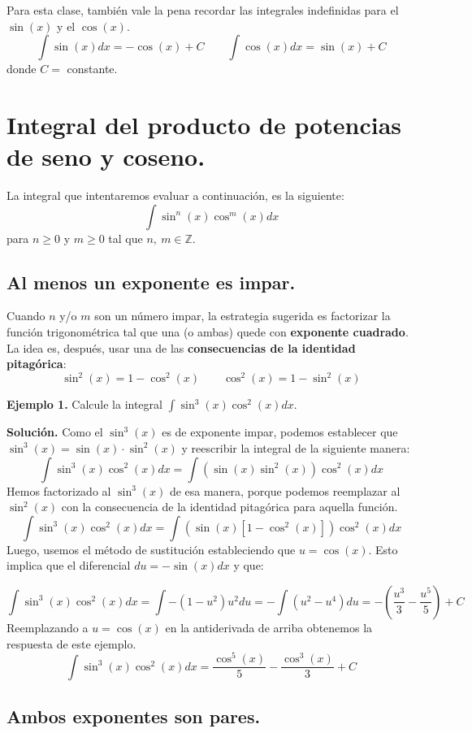 \documentclass[12pt]{article}
\begin{document}
Para esta clase, también vale la pena recordar las integrales indefinidas para el $\sin(x)$ y el $\cos(x)$.
\[
  \int \sin(x)dx = -\cos(x) + C \qquad \int \cos(x)dx = \sin(x) + C
\]
donde $C =$ constante.


\section{Integral del producto de potencias de seno y coseno.}

La integral que intentaremos evaluar a continuación, es la siguiente:
\[
  \int \sin^{n}(x)\cos^{m}(x)dx
\]
para $n \geq 0$ y $m \geq 0$ tal que $n, \ m \in \mathbb{Z}$.

\subsection{Al menos un exponente es impar.}

Cuando $n$ y/o $m$ son un número impar, la estrategia sugerida es factorizar la función trigonométrica tal que una (o ambas) quede con \textbf{exponente cuadrado}. La idea es, después, usar una de las \textbf{consecuencias de la identidad pitagórica}:
\[
  \sin^{2}(x) = 1 - \cos^{2}(x) \qquad \cos^{2}(x) = 1 - \sin^{2}(x)
\]

\textbf{Ejemplo 1.} Calcule la integral $\int \sin^{3}(x)\cos^{2}(x) dx$.

\textbf{Solución.} Como el $\sin^{3}(x)$ es de exponente impar, podemos establecer que $\sin^{3}(x) = \sin(x) \cdot \sin^{2}(x)$ y reescribir la integral de la siguiente manera:
\[
  \int \sin^{3}(x)\cos^{2}(x) dx = \int \left(\sin(x)\sin^{2}(x)\right)\cos^{2}(x) dx
\]
Hemos factorizado al $\sin^{3}(x)$ de esa manera, porque podemos reemplazar al $\sin^{2}(x)$ con la consecuencia de la identidad pitagórica para aquella función.
\[
 \int \sin^{3}(x)\cos^{2}(x) dx = \int \left(\sin(x)[1 - \cos^{2}(x)]\right)\cos^{2}(x) dx
\]
Luego, usemos el método de sustitución estableciendo que $u = \cos(x)$. Esto implica que el diferencial $du = -\sin(x)dx$ y que:

\[
  \int \sin^{3}(x)\cos^{2}(x) dx = \int -(1 - u^{2}) u^{2}du
                                 = - \int (u^{2} - u^{4})du
                                 = - \left(\frac{u^{3}}{3} - \frac{u^{5}}{5}\right) + C
\]
Reemplazando a $u = \cos(x)$ en la antiderivada de arriba obtenemos la respuesta de este ejemplo.
\[
  \int \sin^{3}(x)\cos^{2}(x) dx = \frac{\cos^{5}(x)}{5} - \frac{\cos^{3}(x)}{3} + C
\]

\subsection{Ambos exponentes son pares.}
\end{document}
